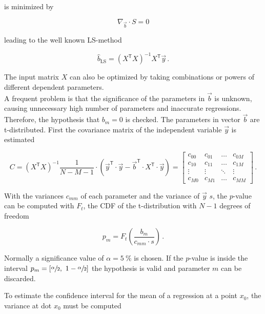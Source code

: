 is minimized by 

\begin{equation}
\nabla_{\vec{b}}\cdot S = 0
\end{equation}

leading to the well known \ac{LS}-method

\begin{equation}
\hat{b}_\text{LS}=\left(X^{\mathsf T} X\right)^{-1} X^{\mathsf T}\vec{y}\,.
\end{equation}

The input matrix $X$ can also be optimized by taking combinations or powers of different dependent parameters.\\
A frequent problem is that the significance of the parameters in $\vec{b}$ is unknown, causing unnecessary high number of parameters and inaccurate regressions. Therefore, the hypothesis that $b_m=0$ is checked. The parameters in vector $\vec{b}$ are t-distributed. First the covariance matrix of the independent variable $\vec{y}$ is estimated \cite{dffs}

\begin{equation}
C = \left(X^{\mathsf T} X\right)^{-1}\frac{1}{N-M-1}\cdot\left(\vec{y}^{\mathsf T}\cdot\vec{y}-\vec{b}^{\mathsf T}\cdot X^{\mathsf T}\cdot \vec{y}\right) = \begin{bmatrix}
c_{00} & c_{01} & \dots & c_{0M} \\
c_{10} & c_{11} & \dots & c_{1M} \\
\vdots & \vdots & \ddots & \vdots \\
c_{M0} & c_{M1} & \dots & c_{MM}  
\end{bmatrix}\,.
\end{equation}

With the variances $c_{mm}$ of each parameter and the variance of $\vec{y}$ $s$, the $p$-value can be computed with $F_t$, the \ac{CDF} of the t-distribution with $N-1$ degrees of freedom

\begin{equation}
p_m = F_t\left(\frac{b_m}{c_{mm}\cdot s}\right)\,.
\end{equation}

Normally a significance value of $\alpha = \SI{5}{\percent}$ is chosen. If the $p$-value is inside the interval $p_m=\left[\sfrac{\alpha}{2},\ 1-\sfrac{\alpha}{2}\right]$ the hypothesis is valid and parameter $m$ can be discarded.

To estimate the confidence interval for the mean of a regression at a point $x_0$, the variance at dot $x_0$ must be computed \cite{dffs}

